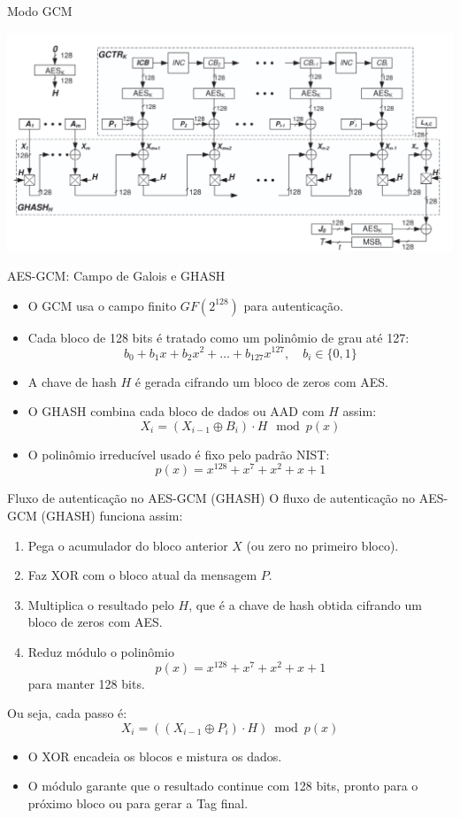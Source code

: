 \begin{frame}{Modo GCM}


\centering
    \includegraphics[width=0.8\linewidth]{Figuras/aes-modo-gcm.png}
    
\end{frame}

\begin{frame}{AES-GCM: Campo de Galois e GHASH}
\begin{itemize}
    \item O GCM usa o campo finito \(GF(2^{128})\) para autenticação.
    \item Cada bloco de 128 bits é tratado como um polinômio de grau até 127:
    \[
        b_0 + b_1 x + b_2 x^2 + \dots + b_{127} x^{127}, \quad b_i \in \{0,1\}
    \]
    \item A chave de hash \(H\) é gerada cifrando um bloco de zeros com AES.
    \item O GHASH combina cada bloco de dados ou AAD com \(H\) assim:
    \[
        X_i = (X_{i-1} \oplus B_i) \cdot H \mod p(x)
    \]
    \item O polinômio irreducível usado é fixo pelo padrão NIST:
    \[
        p(x) = x^{128} + x^7 + x^2 + x + 1
    \]
\end{itemize}
\end{frame}

\begin{frame}{Fluxo de autenticação no AES-GCM (GHASH)}
O fluxo de autenticação no AES-GCM (GHASH) funciona assim:

\begin{enumerate}
    \item Pega o acumulador do bloco anterior $X$ (ou zero no primeiro bloco).
    \item Faz XOR com o bloco atual da mensagem $P$.
    \item Multiplica o resultado pelo $H$, que é a chave de hash obtida cifrando um bloco de zeros com AES.
    \item Reduz módulo o polinômio
    \[
        p(x) = x^{128} + x^7 + x^2 + x + 1
    \]
    para manter 128 bits.
\end{enumerate}

Ou seja, cada passo é:
\[
X_i = ((X_{i-1} \oplus P_i) \cdot H) \bmod p(x)
\]

\begin{itemize}
    \item O XOR encadeia os blocos e mistura os dados.
    \item O módulo garante que o resultado continue com 128 bits, pronto para o próximo bloco ou para gerar a Tag final.
\end{itemize}
\end{frame}

